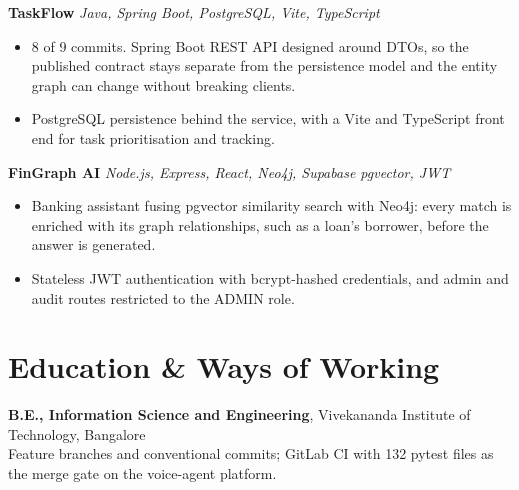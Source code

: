 \documentclass[10pt,a4paper]{article}
\begin{document}
\vspace{1pt}
\textbf{TaskFlow} \textit{Java, Spring Boot, PostgreSQL, Vite, TypeScript}
\begin{itemize}
  \item 8 of 9 commits. Spring Boot REST API designed around DTOs, so the published contract stays
        separate from the persistence model and the entity graph can change without breaking clients.
  \item PostgreSQL persistence behind the service, with a Vite and TypeScript front end for task
        prioritisation and tracking.
\end{itemize}

\vspace{1pt}
\textbf{FinGraph AI} \textit{Node.js, Express, React, Neo4j, Supabase pgvector, JWT}
\begin{itemize}
  \item Banking assistant fusing pgvector similarity search with Neo4j: every match is enriched with
        its graph relationships, such as a loan's borrower, before the answer is generated.
  \item Stateless JWT authentication with bcrypt-hashed credentials, and admin and audit routes
        restricted to the ADMIN role.
\end{itemize}

\section{Education \& Ways of Working}
\textbf{B.E., Information Science and Engineering}, Vivekananda Institute of Technology, Bangalore\\
Feature branches and conventional commits; GitLab CI with 132 pytest files as the merge gate on the
voice-agent platform.
\end{document}
